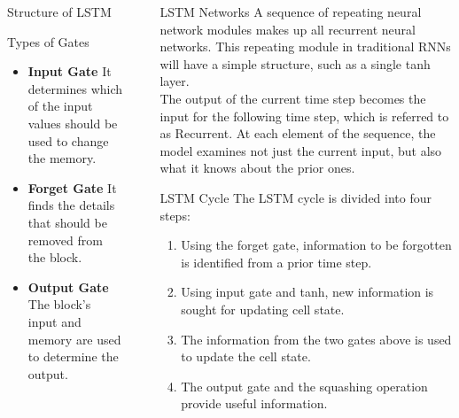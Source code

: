 \documentclass[final]{beamer}
\newlength{\sepwidth}
\newlength{\colwidth}
\newcommand{\separatorcolumn}{\begin{column}{\sepwidth}\end{column}}
\begin{document}
\begin{frame}[t]
\begin{columns}[t]
\begin{column}{\colwidth}
\begin{block}{Structure of LSTM}
  \end{block}

  \begin{block}{Types of Gates}

    

    \begin{itemize}
      \item \textbf{Input Gate} It determines which of the input values should be used to change the memory.
      \item \textbf{Forget Gate} It finds the details that should be removed from the block.
      \item \textbf{Output Gate} The block’s input and memory are used to determine the output.
    \end{itemize}

    

  \end{block}

\end{column}

\separatorcolumn

\begin{column}{\colwidth}

  \begin{block}{LSTM Networks}
A sequence of repeating neural network modules makes up all recurrent neural networks. This repeating module in traditional RNNs will have a simple structure, such as a single tanh layer.\newline \\ 
 The output of the current time step becomes the input for the following time step, which is referred to as Recurrent. At each element of the sequence, the model examines not just the current input, but also what it knows about the prior ones.
\end{block}
\begin{block}{LSTM Cycle}
The LSTM cycle is divided into four steps:\newline
\begin{enumerate}[$\star$]
    
    \item  \space Using the forget gate, information to be forgotten is identified from a prior time step.\newline \newline
    \item \space Using input gate and tanh, new information is sought for updating cell state.\newline \newline
    \item \space The information from the two gates above is used to update the cell state.\newline \newline
    \item \space The output gate and the squashing operation provide useful information.


\end{enumerate}
\end{block}
\end{column}
\end{columns}
\end{frame}
\end{document}
